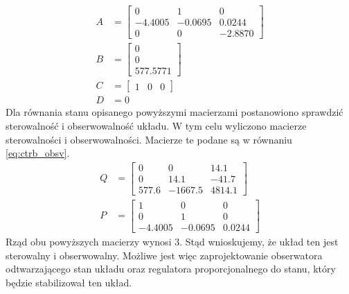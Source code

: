 \documentclass[11pt,a4paper]{article}
\begin{document}
\begin{equation}
\begin{aligned}
A &=
	\begin{bmatrix}
	0 & 1 & 0\\
	-4.4005 & -0.0695 & 0.0244\\
	0 & 0 & -2.8870
	\end{bmatrix}\\
B &=
	\begin{bmatrix}
	0\\
	0\\
	577.5771
	\end{bmatrix}\\
C &=
	\begin{bmatrix}
	1 & 0 & 0
	\end{bmatrix}\\
D &= 0
\end{aligned}
\label{eq:linear_ABCD_val}
\end{equation} 
Dla równania stanu opisanego powyższymi macierzami postanowiono sprawdzić sterowalność i obserwowalność układu. W tym celu wyliczono macierze sterowalności i obserwowalności. Macierze te podane są w równaniu \eqref{eq:ctrb_obsv}.
\begin{equation}
\begin{aligned}
Q &=
	\begin{bmatrix}
	0 & 0 & 14.1\\
	0 & 14.1 & -41.7\\
	577.6 & -1667.5 & 4814.1
	\end{bmatrix}\\
P &=
	\begin{bmatrix}
	1 & 0 & 0\\
	0 & 1 & 0\\
	-4.4005 & -0.0695 & 0.0244
	\end{bmatrix}
\end{aligned}
\label{eq:ctrb_obsv}
\end{equation}
Rząd obu powyższych macierzy wynosi 3. Stąd wnioskujemy, że układ ten jest sterowalny i obserwowalny. Możliwe jest więc zaprojektowanie obserwatora odtwarzającego stan układu oraz regulatora proporcjonalnego do stanu, który będzie stabilizował ten układ.

\newpage
\end{document}
